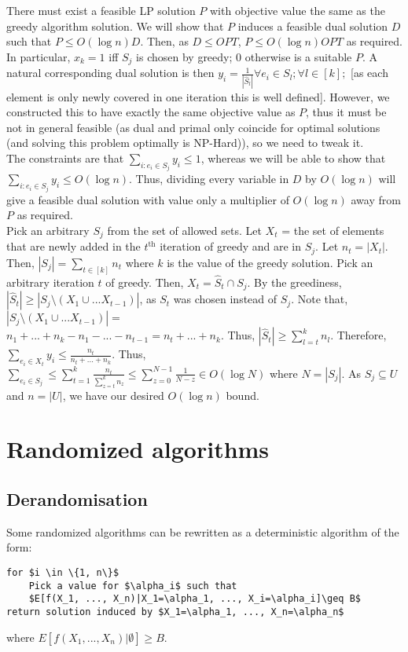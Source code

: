 \documentclass[20pt,a4paper,landscape]{extarticle}
\renewcommand{\th}[1]{#1^\textrm{th}}
\begin{document}
\begin{flushleft}
\begin{itemize}
There must exist a feasible LP solution $P$ with objective value the same as the greedy algorithm solution. We will show that $P$ induces a feasible dual solution $D$ such that $P \leq O(\log n)D$. Then, as $D \leq OPT$, $P \leq O(\log n)OPT$ as required.\\
In particular, $x_k = 1$ iff $S_j$ is chosen by greedy; 0 otherwise is a suitable $P$. A natural corresponding dual solution is then $y_i = \frac{1}{|\hat{S}_l|} \forall e_i \in S_l; \forall l \in [k];$ [as each element is only newly covered in one iteration this is well defined]. However, we constructed this to have exactly the same objective value as $P$, thus it must be not in general feasible (as dual and primal only coincide for optimal solutions (and solving this problem optimally is NP-Hard)), so we need to tweak it.\\
The constraints are that $\sum_{i: e_i \in S_j} y_i \leq 1$, whereas we will be able to show that $\sum_{i: e_i \in S_j} y_i \leq O(\log n)$. Thus, dividing every variable in $D$ by $O(\log n)$ will give a feasible dual solution with value only a multiplier of $O(\log n)$ away from $P$ as required.\\
Pick an arbitrary $S_j$ from the set of allowed sets. Let $X_t$ = the set of elements that are newly added in the $\th{t}$ iteration of greedy and are in $S_j$. Let $n_t = |X_t|$. Then, $|S_j| = \sum_{t \in [k]} n_t$ where $k$ is the value of the greedy solution. Pick an arbitrary iteration $t$ of greedy. Then, $X_t = \hat{S}_t \cap S_j$. By the greediness, $|\hat{S}_t| \geq |S_j \setminus \left(X_1 \cup ... X_{t-1}\right)|$, as $S_t$ was chosen instead of $S_j$. Note that, $|S_j \setminus \left(X_1 \cup ... X_{t-1}\right)| =$\\
$ n_1 + ... + n_k - n_1 - ... - n_{t-1} = n_t + ... + n_k$. Thus, $|\hat{S}_t| \geq \sum_{l=t}^k n_l$. Therefore, $\sum_{e_i \in X_t} y_i \leq \frac{n_t}{n_t + ... + n_k}$. Thus, $\sum_{e_i \in S_j} \leq \sum_{t=1}^k \frac{n_t}{\sum_{z=t}^k n_z} \leq \sum_{z=0}^{N-1} \frac{1}{N-z} \in O(\log N)$ where $N = |S_j|$. As $S_j \subseteq U$ and $n = |U|$, we have our desired $O(\log n)$ bound.
\end{itemize}
\clearpage
\section{Randomized algorithms}
\subsection{Derandomisation}
Some randomized algorithms can be rewritten as a deterministic algorithm of the form:
\begin{lstlisting}
for $i \in \{1, n\}$
    Pick a value for $\alpha_i$ such that
    $E[f(X_1, ..., X_n)|X_1=\alpha_1, ..., X_i=\alpha_i]\geq B$
return solution induced by $X_1=\alpha_1, ..., X_n=\alpha_n$
\end{lstlisting}
where $E[f(X_1, ..., X_n)|\emptyset]\geq B$.


\end{flushleft}
\end{document}
